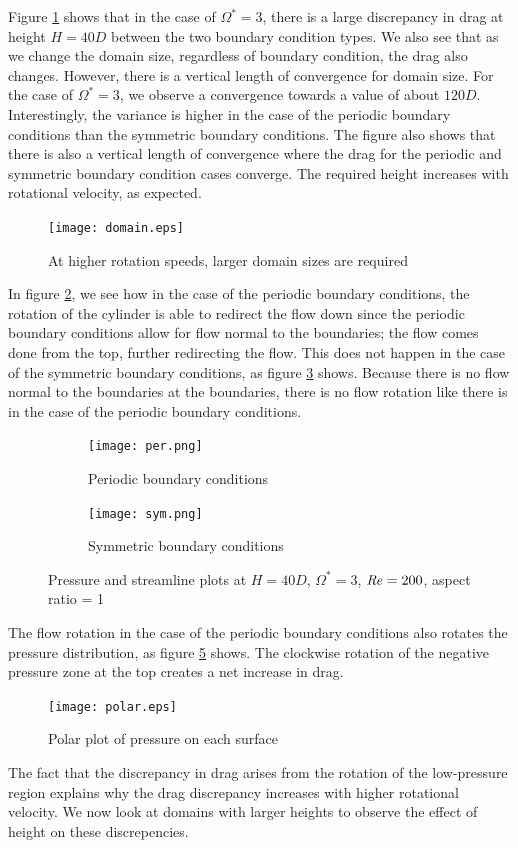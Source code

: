 Figure \ref{fig:domain_conv} shows that in the case of $\Omega^{\ast} = 3$, there is a large discrepancy in drag at height $H = 40D$ between the two boundary condition types. We also see that as we change the domain size, regardless of boundary condition, the drag also changes.  However, there is a vertical length of convergence for domain size. For the case of $\Omega^{\ast} = 3$, we observe a convergence towards a value of about $120D$. Interestingly, the variance is higher in the case of the periodic boundary conditions than the symmetric boundary conditions. The figure also shows that there is also a vertical length of convergence where the drag for the periodic and symmetric boundary condition cases converge. The required height increases with rotational velocity, as expected. 
\begin{figure}
    \centerline{\texttt{[image: domain.eps]}}
    \caption{At higher rotation speeds, larger domain sizes are required}
    \label{fig:domain_conv}
\end{figure}
In figure \ref{fig:per}, we see how in the case of the periodic boundary conditions, the rotation of the cylinder is able to redirect the flow down since the periodic boundary conditions allow for flow normal to the boundaries; the flow comes done from the top, further redirecting the flow. This does not happen in the case of the symmetric boundary conditions, as figure \ref{fig:sym} shows. Because there is no flow normal to the boundaries at the boundaries, there is no flow rotation like there is in the case of the periodic boundary conditions. 
\begin{figure}
    \centering
    \begin{subfigure}{0.49\textwidth}
    \texttt{[image: per.png]}
    \caption{Periodic boundary conditions}
    \label{fig:per}
    \end{subfigure}
    \begin{subfigure}{0.49\textwidth}
    \texttt{[image: sym.png]}
    \caption{Symmetric boundary conditions}
    \label{fig:sym}
    \end{subfigure}
    \caption{Pressure and streamline plots at $H = 40D$, $\Omega^{\ast} = 3$, $\mathit{Re} = 200$, aspect ratio = 1}
    \label{fig:per sym}
\end{figure}
The flow rotation in the case of the periodic boundary conditions also rotates the pressure distribution, as figure \ref{fig:polar pres} shows. The clockwise rotation of the negative pressure zone at the top creates a net increase in drag.
\begin{figure}
    \centerline{\texttt{[image: polar.eps]}}
    \caption{Polar plot of pressure on each surface}
    \label{fig:polar pres}
\end{figure}
The fact that the discrepancy in drag arises from the rotation of the low-pressure region explains why the drag discrepancy increases with higher rotational velocity. We now look at domains with larger heights to observe the effect of height on these discrepencies.

